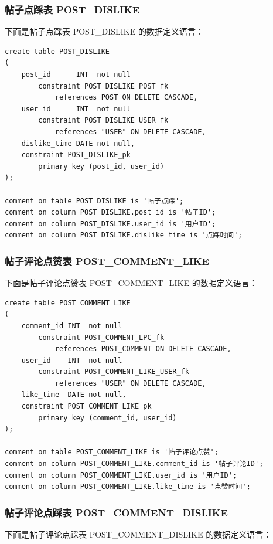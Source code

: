 \subsubsection{帖子点踩表 POST\_DISLIKE}

下面是帖子点踩表 POST\_DISLIKE 的数据定义语言：

\begin{verbatim}
create table POST_DISLIKE
(
    post_id      INT  not null
        constraint POST_DISLIKE_POST_fk
            references POST ON DELETE CASCADE,
    user_id      INT  not null
        constraint POST_DISLIKE_USER_fk
            references "USER" ON DELETE CASCADE,
    dislike_time DATE not null,
    constraint POST_DISLIKE_pk
        primary key (post_id, user_id)
);

comment on table POST_DISLIKE is '帖子点踩';
comment on column POST_DISLIKE.post_id is '帖子ID';
comment on column POST_DISLIKE.user_id is '用户ID';
comment on column POST_DISLIKE.dislike_time is '点踩时间';
\end{verbatim}

\subsubsection{帖子评论点赞表 POST\_COMMENT\_LIKE}

下面是帖子评论点赞表 POST\_COMMENT\_LIKE 的数据定义语言：

\begin{verbatim}
create table POST_COMMENT_LIKE
(
    comment_id INT  not null
        constraint POST_COMMENT_LPC_fk
            references POST_COMMENT ON DELETE CASCADE,
    user_id    INT  not null
        constraint POST_COMMENT_LIKE_USER_fk
            references "USER" ON DELETE CASCADE,
    like_time  DATE not null,
    constraint POST_COMMENT_LIKE_pk
        primary key (comment_id, user_id)
);

comment on table POST_COMMENT_LIKE is '帖子评论点赞';
comment on column POST_COMMENT_LIKE.comment_id is '帖子评论ID';
comment on column POST_COMMENT_LIKE.user_id is '用户ID';
comment on column POST_COMMENT_LIKE.like_time is '点赞时间';
\end{verbatim}

\subsubsection{帖子评论点踩表 POST\_COMMENT\_DISLIKE}

下面是帖子评论点踩表 POST\_COMMENT\_DISLIKE 的数据定义语言：

